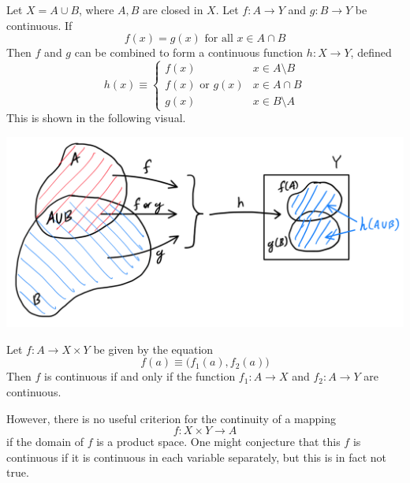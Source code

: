 \documentclass{article}
\begin{document}
    \begin{lemma}
      Let $X = A \cup B$, where $A, B$ are closed in $X$. Let $f: A \longrightarrow Y$ and $g: B \longrightarrow Y$ be continuous. If 
      \begin{equation}
        f(x) = g(x) \text{ for all } x \in A \cap B
      \end{equation}
      Then $f$ and $g$ can be combined to form a continuous function $h: X \longrightarrow Y$, defined
      \begin{equation}
        h(x) \equiv \begin{cases}
          f(x) & x \in A \setminus B \\
          f(x) \text{ or } g(x) & x \in A \cap B \\
          g(x) & x \in B \setminus A
        \end{cases}
      \end{equation}
      This is shown in the following visual. 
      \begin{center}
          \includegraphics[scale=0.25]{img/Gluing_Lemma.PNG}
      \end{center}
    \end{lemma}

    \begin{theorem}
      Let $f: A \longrightarrow X \times Y$ be given by the equation 
      \begin{equation}
        f(a) \equiv \big( f_1 (a), f_2(a) \big)
      \end{equation}
      Then $f$ is continuous if and only if the function $f_1: A \longrightarrow X$ and $f_2: A \longrightarrow Y$ are continuous. 
    \end{theorem}

    However, there is no useful criterion for the continuity of a mapping 
    \begin{equation}
      f: X \times Y \longrightarrow A
    \end{equation}
    if the domain of $f$ is a product space. One might conjecture that this $f$ is continuous if it is continuous in each variable separately, but this is in fact not true. 
\end{document}
